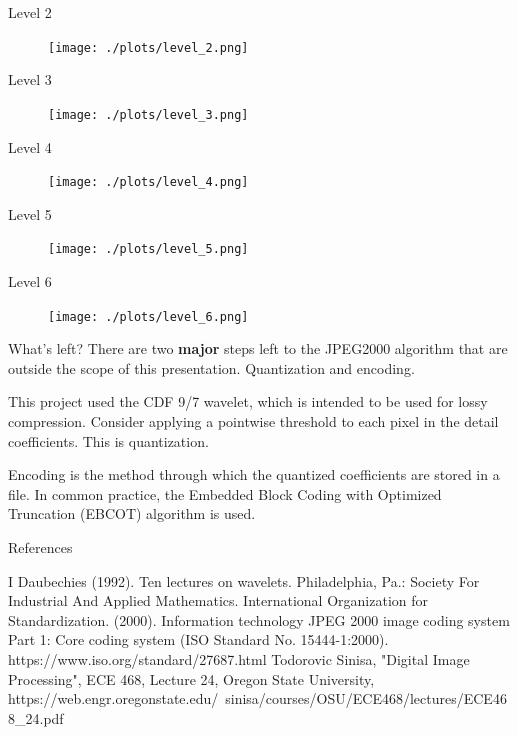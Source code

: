 \documentclass[9pt]{beamer}
\begin{document}
\begin{frame}{Level 2}
	\begin{figure}
		\centering
		\texttt{[image: ./plots/level\_2.png]}
	\end{figure}	
\end{frame}

\begin{frame}{Level 3}
	\begin{figure}
		\centering
		\texttt{[image: ./plots/level\_3.png]}
	\end{figure}
\end{frame}

\begin{frame}{Level 4}
	\begin{figure}
		\centering
		\texttt{[image: ./plots/level\_4.png]}
	\end{figure}
\end{frame}

\begin{frame}{Level 5}
	\begin{figure}
		\centering
		\texttt{[image: ./plots/level\_5.png]}
	\end{figure}
\end{frame}

\begin{frame}{Level 6}
	\begin{figure}
		\centering
		\texttt{[image: ./plots/level\_6.png]}
	\end{figure}
\end{frame}


\begin{frame}{What's left?}
	There are two \textbf{major} steps left to the JPEG2000 algorithm that
	are outside the scope of this presentation. Quantization and encoding.

	\vspace{1cm}

	This project used the CDF 9/7 wavelet, which is intended to be used
	for lossy compression. Consider applying a pointwise threshold to
	each pixel in the detail coefficients. This is quantization.

	\vspace{0.5cm}

	Encoding is the method through which the quantized coefficients are
	stored in a file. In common practice, the Embedded Block Coding with
	Optimized Truncation (EBCOT) algorithm is used.
	
\end{frame}

\begin{frame}{References}
	\begin{thebibliography}{}
		I Daubechies (1992). Ten lectures on wavelets. Philadelphia, Pa.: Society For Industrial And Applied Mathematics.
	 International Organization for Standardization. (2000). Information technology
JPEG 2000 image coding system
Part 1: Core coding system (ISO Standard No. 15444-1:2000). https://www.iso.org/standard/27687.html 
	 Todorovic Sinisa, "Digital Image Processing", ECE 468, Lecture 24, Oregon State University, https://web.engr.oregonstate.edu/~sinisa/courses/OSU/ECE468/lectures/ECE468\_24.pdf 
	\end{thebibliography}
\end{frame}
\end{document}
